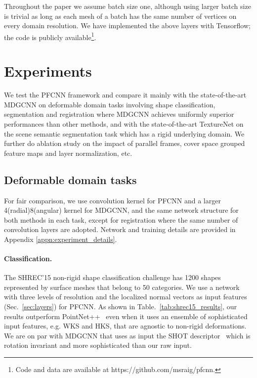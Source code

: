 \documentclass[10pt,twocolumn,letterpaper]{article}
\begin{document}
Throughout the paper we assume batch size one, although using larger batch size is trivial as long as each mesh of a batch has the same number of vertices on every domain resolution. 
We have implemented the above layers with Tensorflow; the code is publicly available\footnote{Code and data are available at https://github.com/msraig/pfcnn.}.

 \section{Experiments}
\label{sec:results}

We test the PFCNN framework and compare it mainly with the state-of-the-art MDGCNN \cite{Poulenard:2018:Multidirectional} on deformable domain tasks involving shape classification, segmentation and registration where MDGCNN achieves uniformly superior performances than other methods, and with the state-of-the-art TextureNet \cite{Huang_2019_CVPR} on the scene semantic segmentation task which has a rigid underlying domain.
We further do ablation study on the impact of parallel frames, cover space grouped feature maps and layer normalization, etc.

\subsection{Deformable domain tasks}
\label{sec:deformable_tasks}
For fair comparison, we use  convolution kernel for PFCNN and a larger 4(radial)8(angular) kernel for MDGCNN, and the same network structure for both methods in each task, except for registration where the same number of convolution layers are adopted. 
Network and training details are provided in Appendix \ref{appn:experiment_details}.

\vspace{-4mm}
\paragraph{Classification.}
The SHREC'15 non-rigid shape classification challenge \cite{shrec15} has 1200 shapes represented by surface meshes that belong to 50 categories.
We use a network with three levels of resolution and the localized normal vectors as input features (Sec.~\ref{sec:layers}) for PFCNN.
As shown in Table.~\ref{tab:shrec15_results}, our results outperform PointNet++~\cite{qi2017pointnetplusplus} even when it uses an ensemble of sophisticated input features, e.g. WKS and HKS, that are agnostic to non-rigid deformations.
We are on par with MDGCNN that uses as input the SHOT descriptor~\cite{tombari2010unique} which is rotation invariant and more sophisticated than our raw input.
\end{document}
